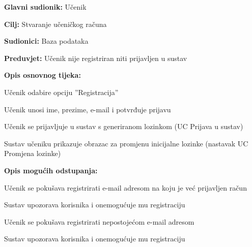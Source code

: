 					\noindent {}
					\begin{packed_item}
	
						\item \textbf{Glavni sudionik:} Učenik
						\item  \textbf{Cilj:} Stvaranje učeničkog računa
						\item  \textbf{Sudionici:} Baza podataka
						\item  \textbf{Preduvjet:} Učenik nije registriran niti prijavljen u sustav
						\item  \textbf{Opis osnovnog tijeka:}
						
						\item[] \begin{packed_enum}
	
							\item Učenik odabire opciju ”Registracija”
							\item Učenik unosi ime, prezime, e-mail i potvrđuje prijavu
							\item Učenik se prijavljuje u sustav s generiranom lozinkom (UC Prijava u sustav)							
							\item Sustav učeniku prikazuje obrazac za promjenu inicijalne lozinke (nastavak UC Promjena lozinke)
						\end{packed_enum}
						
						\item  \textbf{Opis mogućih odstupanja:}
						
						\item[] \begin{packed_item}
	
							\item[2.a]Učenik se pokušava registrirati e-mail adresom na koju je već prijavljen račun
							\item[] \begin{packed_enum}
								
								\item Sustav upozorava korisnika i onemogućuje mu registraciju							
							\end{packed_enum}

							\item[2.b] Učenik se pokušava registrirati nepostojećom e-mail adresom
							\item[] \begin{packed_enum}
								
								\item Sustav upozorava korisnika i onemogućuje mu registraciju 								
							\end{packed_enum}
							
						\end{packed_item}
					\end{packed_item}

